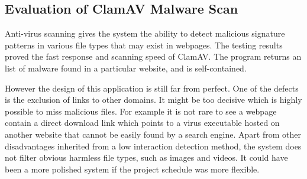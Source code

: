 \subsection{Evaluation of ClamAV Malware Scan}
Anti-virus scanning gives the system the ability to detect malicious 
signature patterns in various file types that may exist in webpages. The 
testing results proved the fast response and scanning speed of ClamAV. The 
program returns an list of malware found in a particular website, and 
is self-contained.

However the design of this application is still far from perfect. One of the 
defects is the exclusion of links to other domains. It might be too 
decisive which is highly possible to miss malicious files. For example it is 
not rare to see a webpage contain a direct download link which points to a 
virus executable hosted on another website that cannot be easily found by 
a search engine. Apart from other disadvantages inherited from a low interaction 
detection method, the system does not filter obvious 
harmless file types, such as images and videos. It could have been a more polished system if 
the project schedule was more flexible.

